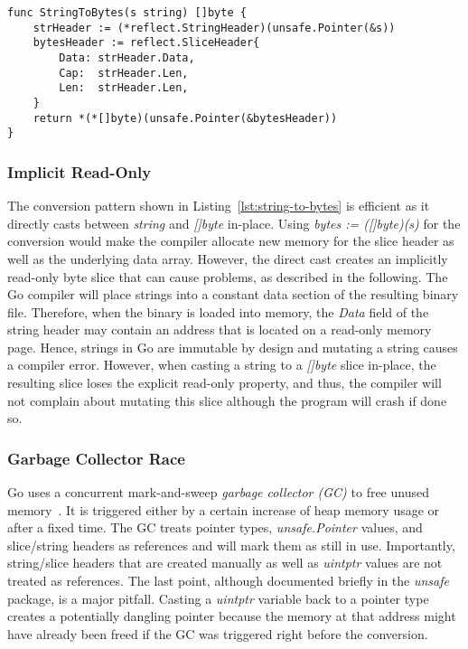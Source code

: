 \begin{lstlisting}[language=Golang, label=lst:string-to-bytes, caption=Conversion from string to bytes using \unsafe{}, float, belowskip=-1.5em]
func StringToBytes(s string) []byte {
	strHeader := (*reflect.StringHeader)(unsafe.Pointer(&s))
	bytesHeader := reflect.SliceHeader{
		Data: strHeader.Data,
		Cap:  strHeader.Len,
		Len:  strHeader.Len,
	}
	return *(*[]byte)(unsafe.Pointer(&bytesHeader))
}
\end{lstlisting}


\subsubsection*{Implicit Read-Only}

The conversion pattern shown in Listing~\ref{lst:string-to-bytes} is efficient as it directly casts between \textit{string} and \textit{[]byte} in-place. %
Using \textit{bytes := ([]byte)(s)} for the conversion would make the compiler allocate new memory for the slice header as well as the underlying data array.
However, the direct cast creates an implicitly read-only byte slice that can cause problems, as described in the following.
The Go compiler will place strings into a constant data section of the resulting binary file.
Therefore, when the binary is loaded into memory, the \textit{Data} field of the string header may contain an address that is located on a read-only memory page.
Hence, strings in Go are immutable by design and mutating a string causes a compiler error. %
However, when casting a string to a \textit{[]byte} slice in-place, the resulting slice loses the explicit read-only property, and thus, the compiler will not complain about mutating this slice although the program will crash if done so.


\subsubsection*{Garbage Collector Race}

Go uses a concurrent mark-and-sweep \textit{garbage collector (GC)} to free unused memory~\cite{sibiryov2017}.
It is triggered either by a certain increase of heap memory usage or after a fixed time. %
The GC treats pointer types, \textit{unsafe.Pointer} values, and slice/string headers as references and will mark them as still in use. %
Importantly, string/slice headers that are created manually as well as \textit{uintptr} values are not treated as references.
The last point, although documented briefly in the \textit{unsafe} package, is a major pitfall.
Casting a \textit{uintptr} variable back to a pointer type creates a potentially dangling pointer because the memory at that address might have already been freed if the GC was triggered right before the conversion.

